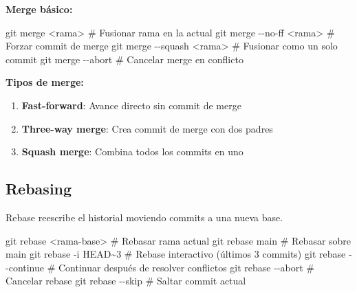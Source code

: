 \documentclass[
  doc,
  floatsintext,
  longtable,
  a4paper,
  nolmodern,
  notxfonts,
  notimes,
  12pt,
  colorlinks=true,linkcolor=blue,citecolor=blue,urlcolor=blue]{apa7}
\newenvironment{Shaded}{\begin{snugshade}}{\end{snugshade}}
\newcommand{\AttributeTok}[1]{\textcolor[rgb]{0.40,0.45,0.13}{#1}}
\newcommand{\CommentTok}[1]{\textcolor[rgb]{0.37,0.37,0.37}{#1}}
\newcommand{\FunctionTok}[1]{\textcolor[rgb]{0.28,0.35,0.67}{#1}}
\newcommand{\NormalTok}[1]{\textcolor[rgb]{0.00,0.23,0.31}{#1}}
\newcommand{\OperatorTok}[1]{\textcolor[rgb]{0.37,0.37,0.37}{#1}}
\providecommand{\tightlist}{%
  \setlength{\itemsep}{0pt}\setlength{\parskip}{0pt}}
\begin{document}
\textbf{Merge básico:}

\begin{Shaded}
\begin{Highlighting}[]
\FunctionTok{git}\NormalTok{ merge }\OperatorTok{\textless{}}\NormalTok{rama}\OperatorTok{\textgreater{}}           \CommentTok{\# Fusionar rama en la actual}
\FunctionTok{git}\NormalTok{ merge }\AttributeTok{{-}{-}no{-}ff} \OperatorTok{\textless{}}\NormalTok{rama}\OperatorTok{\textgreater{}}   \CommentTok{\# Forzar commit de merge}
\FunctionTok{git}\NormalTok{ merge }\AttributeTok{{-}{-}squash} \OperatorTok{\textless{}}\NormalTok{rama}\OperatorTok{\textgreater{}}  \CommentTok{\# Fusionar como un solo commit}
\FunctionTok{git}\NormalTok{ merge }\AttributeTok{{-}{-}abort}          \CommentTok{\# Cancelar merge en conflicto}
\end{Highlighting}
\end{Shaded}

\textbf{Tipos de merge:}

\begin{enumerate}
\def\labelenumi{\arabic{enumi}.}
\tightlist
\item
  \textbf{Fast-forward}: Avance directo sin commit de merge
\item
  \textbf{Three-way merge}: Crea commit de merge con dos padres
\item
  \textbf{Squash merge}: Combina todos los commits en uno
\end{enumerate}

\subsection{Rebasing}\label{rebasing}

Rebase reescribe el historial moviendo commits a una nueva base.

\begin{Shaded}
\begin{Highlighting}[]
\FunctionTok{git}\NormalTok{ rebase }\OperatorTok{\textless{}}\NormalTok{rama{-}base}\OperatorTok{\textgreater{}}     \CommentTok{\# Rebasar rama actual}
\FunctionTok{git}\NormalTok{ rebase main            }\CommentTok{\# Rebasar sobre main}
\FunctionTok{git}\NormalTok{ rebase }\AttributeTok{{-}i}\NormalTok{ HEAD\textasciitilde{}3       }\CommentTok{\# Rebase interactivo (últimos 3 commits)}
\FunctionTok{git}\NormalTok{ rebase }\AttributeTok{{-}{-}continue}      \CommentTok{\# Continuar después de resolver conflictos}
\FunctionTok{git}\NormalTok{ rebase }\AttributeTok{{-}{-}abort}         \CommentTok{\# Cancelar rebase}
\FunctionTok{git}\NormalTok{ rebase }\AttributeTok{{-}{-}skip}          \CommentTok{\# Saltar commit actual}
\end{Highlighting}
\end{Shaded}
\end{document}
